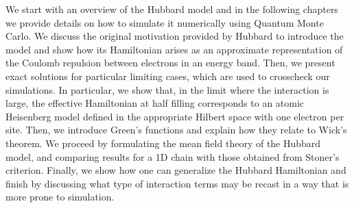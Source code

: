 \label{cap:hubbard}

\slshape

We start with an overview of the Hubbard model and in the following chapters we provide details on how to simulate it numerically using Quantum Monte Carlo. We discuss the original motivation provided by Hubbard to introduce the model and show how its Hamiltonian arises as an approximate representation of the Coulomb repulsion between electrons in an energy band. Then, we present exact solutions for particular limiting cases, which are used to crosscheck our simulations. In particular, we show that, in the limit where the interaction is large, the effective Hamiltonian at half filling corresponds to an atomic Heisenberg model defined in the appropriate Hilbert space with one electron per site.
Then, we introduce Green's functions and explain how they relate to Wick's theorem. We proceed by formulating the mean field theory of the Hubbard model, and comparing results for a \acs{1D} chain with those obtained from Stoner's criterion.
Finally, we show how one can generalize the Hubbard Hamiltonian and finish by discussing what type of interaction terms may be recast in a way that is more prone to simulation.

\normalfont









